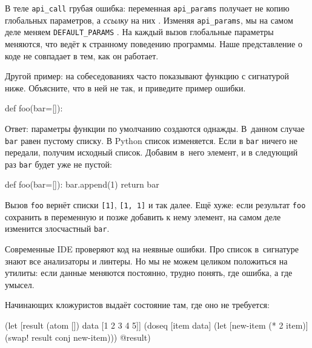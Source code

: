 \fi


В теле \verb|api_call| грубая ошибка: переменная \verb|api_params| получает
не копию глобальных параметров, а \emph{ссылку} на них \ifnarrow{}\else{}\fi. Изменяя \verb|api_params|, мы на самом деле меняем \verb|DEFAULT_PARAMS|
\ifnarrow{}\else{}\fi. На каждый вызов
глобальные параметры меняются, что ведёт к странному поведению программы.
Наше представление о коде не совпадает в тем, как он работает.

Другой пример: на собеседованиях часто показывают функцию с сигнатурой
ниже. Объясните, что в ней не так, и приведите пример ошибки.

\begin{english}
  \begin{python}
def foo(bar=[]):
  \end{python}
\end{english}

Ответ: параметры функции по умолчанию создаются однажды. В~данном случае
\verb|bar| равен пустому списку. В Python список изменяется. Если в
\verb|bar| ничего не передали, получим исходный список. Добавим в~него
элемент, и в следующий раз \verb|bar| будет уже не пустой:

\begin{english}
  \begin{python}
def foo(bar=[]):
    bar.append(1)
    return bar
  \end{python}
\end{english}

Вызов \verb|foo| вернёт списки \verb|[1]|, \verb|[1, 1]| и так
далее. Ещё хуже: если результат \verb|foo| сохранить в переменную и позже
добавить к нему элемент, на самом деле изменится злосчастный \verb|bar|.

Современные IDE проверяют код на неявные ошибки. Про список в~сигнатуре знают
все анализаторы и линтеры. Но мы не можем целиком положиться на утилиты: если
данные меняются постоянно, трудно понять, где ошибка, а где умысел.

Начинающих кложуристов выдаёт состояние там, где оно не требуется:

\begin{english}
  \begin{clojure}
(let [result (atom [])
      data [1 2 3 4 5]]
  (doseq [item data]
    (let [new-item (* 2 item)]
      (swap! result conj new-item)))
  @result)
  \end{clojure}
\end{english}

